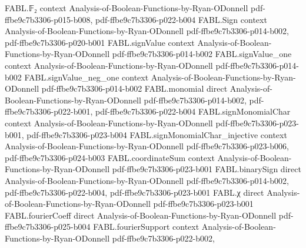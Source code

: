 \begin{theorem}
\label{FABL.sum_sq_tail_fourierCoeff_le_of_restrictions}
\leanok
{}
\proofstep
  {FABL.𝔽₂}
  {context}
  {Analysis-of-Boolean-Functions-by-Ryan-ODonnell}
  {pdf-ffbe9c7b3306-p015-b008,
    pdf-ffbe9c7b3306-p022-b004}
\proofstep
  {FABL.Sign}
  {context}
  {Analysis-of-Boolean-Functions-by-Ryan-ODonnell}
  {pdf-ffbe9c7b3306-p014-b002,
    pdf-ffbe9c7b3306-p020-b001}
\proofstep
  {FABL.signValue}
  {context}
  {Analysis-of-Boolean-Functions-by-Ryan-ODonnell}
  {pdf-ffbe9c7b3306-p014-b002}
\proofstep
  {FABL.signValue_one}
  {context}
  {Analysis-of-Boolean-Functions-by-Ryan-ODonnell}
  {pdf-ffbe9c7b3306-p014-b002}
\proofstep
  {FABL.signValue_neg_one}
  {context}
  {Analysis-of-Boolean-Functions-by-Ryan-ODonnell}
  {pdf-ffbe9c7b3306-p014-b002}
\proofstep
  {FABL.monomial}
  {direct}
  {Analysis-of-Boolean-Functions-by-Ryan-ODonnell}
  {pdf-ffbe9c7b3306-p014-b002,
    pdf-ffbe9c7b3306-p022-b001,
    pdf-ffbe9c7b3306-p022-b004}
\proofstep
  {FABL.signMonomialChar}
  {context}
  {Analysis-of-Boolean-Functions-by-Ryan-ODonnell}
  {pdf-ffbe9c7b3306-p023-b001,
    pdf-ffbe9c7b3306-p023-b004}
\proofstep
  {FABL.signMonomialChar_injective}
  {context}
  {Analysis-of-Boolean-Functions-by-Ryan-ODonnell}
  {pdf-ffbe9c7b3306-p023-b006,
    pdf-ffbe9c7b3306-p024-b003}
\proofstep
  {FABL.coordinateSum}
  {context}
  {Analysis-of-Boolean-Functions-by-Ryan-ODonnell}
  {pdf-ffbe9c7b3306-p023-b001}
\proofstep
  {FABL.binarySign}
  {direct}
  {Analysis-of-Boolean-Functions-by-Ryan-ODonnell}
  {pdf-ffbe9c7b3306-p014-b002,
    pdf-ffbe9c7b3306-p022-b004,
    pdf-ffbe9c7b3306-p023-b001}
\proofstep
  {FABL.χ}
  {direct}
  {Analysis-of-Boolean-Functions-by-Ryan-ODonnell}
  {pdf-ffbe9c7b3306-p023-b001}
\proofstep
  {FABL.fourierCoeff}
  {direct}
  {Analysis-of-Boolean-Functions-by-Ryan-ODonnell}
  {pdf-ffbe9c7b3306-p025-b004}
\proofstep
  {FABL.fourierSupport}
  {context}
  {Analysis-of-Boolean-Functions-by-Ryan-ODonnell}
  {pdf-ffbe9c7b3306-p022-b002,
}
\end{theorem}
